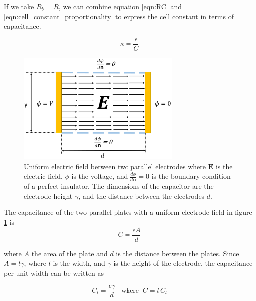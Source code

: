   \par If we take $R_b = R$, we can combine equation \ref{eqn:RC} and \ref{eqn:cell_constant_proportionality} to express the cell constant in terms of capacitance.
  
  \begin{equation}
      \kappa = \frac{\epsilon}{C}
      \label{eqn:cell_constant_C}
  \end{equation}
  
   \begin{figure}[ht]
  \centering
  \includegraphics[width=0.7\textwidth]{images/capacitorNoFringe.png}
  \caption[Uniform electric field between parallel plates]{Uniform electric field between two parallel electrodes where $\boldsymbol{E}$ is the electric field, $\phi$ is the voltage, and $\frac{d\phi}{d\boldsymbol{n}}=0$ is the boundary condition of a perfect insulator. The dimensions of the capacitor are the electrode height $\gamma$, and the distance between the electrodes $d$.}
  \label{fig:parallel_capacitor}
  \end{figure}
  
  \par The capacitance of the two parallel plates with a uniform electrode field in figure \ref{fig:parallel_capacitor} is
  \begin{equation}
      C = \frac{\epsilon A}{d}
      \label{eqn:capacitor}
  \end{equation}
  
  \noindent where $A$ the area of the plate and $d$ is the distance between the plates. Since $A = l\gamma$, where $l$ is the width, and $\gamma$ is the height of the electrode, the capacitance per unit width can be written as
  
  \begin{equation}
      C_l = \frac{\epsilon\gamma}{d} \;\;\;\text{where} \;\; C =l\, C_l
      \label{eqn:specific_capacitance}
  \end{equation}
  
